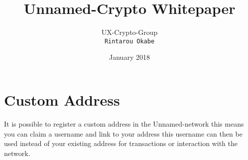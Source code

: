 \documentclass{article}
\title{Unnamed-Crypto Whitepaper}
\author{
UX-Crypto-Group\\
{\tt\small Rintarou Okabe}\\
}
\date{January 2018}
\begin{document}
\maketitle

\section{Custom Address}
It is possible to register a custom address in the Unnamed-network this means you can claim
a username and link to your address this username can then be used instead of your existing address for transactions or interaction with the network. 
\end{document}
